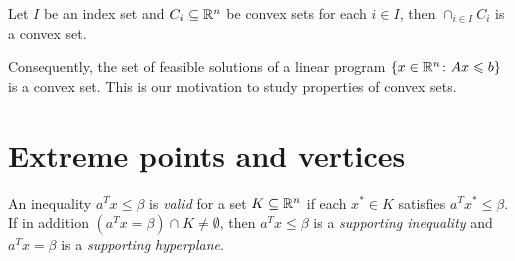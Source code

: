 \begin{proposition}
  \label{lem:1}
  Let $I$ be an index set and $C_i \subseteq \mathbb{R}^n$ be convex sets for
  each $i \in I$, then $\cap_{i \in I}C_i$ is a convex set.
\end{proposition}

Consequently, the set of feasible solutions of a linear program $\{x
\in \mathbb{R}^n \colon Ax \leqslant b\}$ is a convex set. This is our motivation
to study properties of convex sets.


\section{Extreme points and vertices}
\label{sec:extr-points-vert}


\begin{definition}
  An inequality $a^Tx \leq \beta$ is \emph{valid} for a  set $K \subseteq \mathbb{R}^n$ if each $x^* \in K$ satisfies $a^Tx^* \leq \beta$.  If in addition $(a^Tx = β) \cap K \neq\emptyset$,
then $a^Tx\leq β$ is a \emph{supporting inequality} and $a^Tx = β$ is a
\emph{supporting hyperplane}. 
\end{definition}



     
      
      
      
      
          
      
          
    
